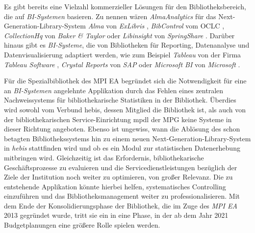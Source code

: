 Es gibt bereits eine Vielzahl kommerzieller Lösungen für den Bibliotheksbereich, die auf \textit{\acrshort{BI}-Systemen} basieren.
Zu nennen wären \textit{AlmaAnalytics} für das Next-Generation-Library-System \textit{Alma} von \textit{ExLibris} \cite{ex_libris_alma_2020},
\textit{BibControl} vom \acrfull{OCLC} \cite{oclc_bibcontrol_2020},
\textit{CollectionHq} von \textit{Baker \& Taylor}\cite{baker__taylor_select_2020} oder \textit{Libinsight} von \textit{SpringShare} \cite{springShare_libinsight_2020}.
Darüber hinaus gibt es \textit{\acrlong{BI}-Systeme}, die von Bibliotheken für Reporting, Datenanalyse und Datenvisualisierung adaptiert werden,
wie zum Beispiel \textit{Tableau} von der Firma \textit{Tableau Software} \cite{tableau_software_software_2020},
\textit{Crystal Reports} von \textit{SAP} \cite{sap_pixel-perfect_2020} oder \textit{Microsoft BI} von \textit{Microsoft} \cite{microsoft_datenvisualisierung_2020}.

Für die Spezialbibliothek des \acrfull{MPI EA} begründet sich die Notwendigkeit für eine an \textit{\acrshort{BI}-Systemen} angelehnte Applikation durch das
Fehlen eines zentralen Nachweissystems für bibliothekarische
Statistiken in der Bibliothek. Überdies wird sowohl vom Verbund \acrfull{hebis}, dessen Mitglied die Bibliothek ist, als auch 
von der bibliothekarischen Service-Einrichtung \acrfull{mpdl} der \acrfull{MPG} keine Systeme in dieser Richtung angeboten. Ebenso ist ungewiss, wann die Ablösung des schon betagten Bibliothekssystems hin zu 
einem neuen Next-Generation-Library-System in \textit{\acrshort{hebis}} stattfinden wird und ob
es ein Modul zur statistischen Datenerhebung mitbringen wird. 
Gleichzeitig ist das Erfordernis, bibliothekarische Geschäftsprozesse zu evaluieren und die
Servicedienstleistungen bezüglich der Ziele der Institution noch weiter zu
optimieren, von großer Relevanz. 
Die zu entstehende Applikation könnte hierbei helfen, systematisches Controlling einzuführen und das
Bibliotheksmanagement weiter zu professionalisieren.
Mit dem Ende der Konsolidierungsphase der
Bibliothek, die im Zuge des \textit{\acrshort{MPI EA}} 2013 gegründet wurde, tritt sie ein in eine Phase, in der ab dem Jahr
2021 Budgetplanungen eine größere Rolle spielen werden.


